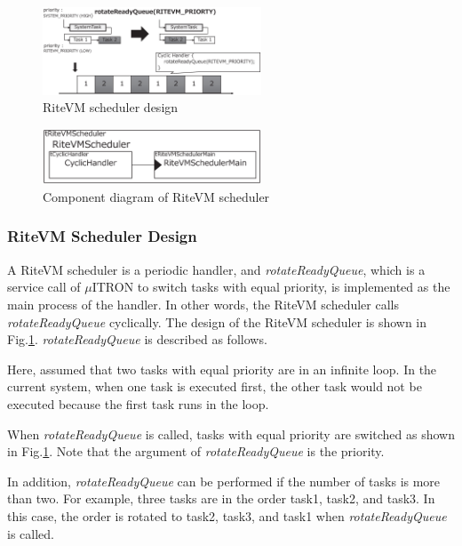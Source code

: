 \documentclass[S,R,E]{article/compsoft}
\begin{document}
\begin{figure}[t]
    \centering
    \includegraphics[width=6.5cm,clip]{figure/rotateReadyQueue.eps}
\caption{RiteVM scheduler design}
\label{fig:rotateReadyQueue}
\end{figure} 
\begin{figure}[t]
    \centering
    \includegraphics[width=6.5cm,clip]{figure/cyclic_handler.eps}
\caption{Component diagram of RiteVM scheduler}
\label{fig:cyclic_handler}
\end{figure}


\subsubsection{RiteVM Scheduler Design}
A RiteVM scheduler is a periodic handler, and {\it rotateReadyQueue}, which is a service call of $\mu$ITRON to switch tasks with equal priority, is implemented as the main process of the handler.
In other words, the RiteVM scheduler calls {\it rotateReadyQueue} cyclically.
The design of the RiteVM scheduler is shown in Fig.\ref{fig:rotateReadyQueue}. 
{\it rotateReadyQueue} is described as follows.

Here, assumed that two tasks with equal priority are in an infinite loop.
In the current system, when one task is executed first, the other task would not be executed because the first task runs in the loop.

When {\it rotateReadyQueue} is called, tasks with equal priority are switched as shown in Fig.\ref{fig:rotateReadyQueue}.
Note that the argument of {\it rotateReadyQueue} is the priority.

In addition, {\it rotateReadyQueue} can be performed if the number of tasks is more than two.
For example, three tasks are in the order task1, task2, and task3.
In this case, the order is rotated to task2, task3, and task1 when {\it rotateReadyQueue} is called.
\end{document}
